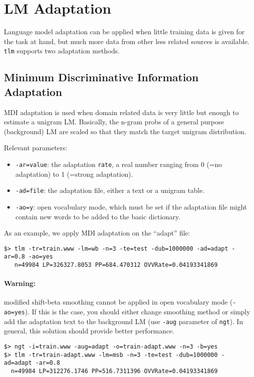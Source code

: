 \documentclass[11pt]{article}
\begin{document}
\newpage
\section{LM Adaptation}
Language model adaptation can be  applied when little training data is given for the 
task at hand, but much more data from other less related sources is available.  {\tt tlm} supports two adaptation methods.

\subsection{Minimum Discriminative Information Adaptation}
MDI adaptation  is used  when domain related  data is very  little but
enough to  estimate a  unigram LM.  Basically,  the n-gram probs  of a
general  purpose (background)  LM are  scaled so  that they  match the
target unigram distribution.
	
\noindent	 
Relevant parameters:
\begin{itemize}
\item {\tt -ar=value}: the adaptation {\tt rate},  a real number ranging 
 from 0 (=no adaptation) to 1 (=strong adaptation).

\item {\tt -ad=file}: the  adaptation file,  either a text  or a
  unigram table.

\item {\tt -ao=y}: open vocabulary mode, which  must be set if the adaptation file
 might contain new words to be added to the basic dictionary.
\end{itemize}

\noindent
As an example, we apply MDI adaptation on the ``adapt'' file:
\begin{small}
\begin{verbatim}
$> tlm -tr=train.www -lm=wb -n=3 -te=test -dub=1000000 -ad=adapt -ar=0.8 -ao=yes
   n=49984 LP=326327.8053 PP=684.470312 OVVRate=0.04193341869
\end{verbatim}
\end{small}

\noindent
\paragraph{Warning:}  modified shift-beta  smoothing  cannot  be applied  in  open
vocabulary mode  ({\tt -ao=yes}).  If  this is the  case, you  should either
change  smoothing method  or simply  add  the adaptation  text to  the
background LM (use {\tt -aug} parameter  of {\tt ngt}). In
general, this solution should  provide better performance.
\begin{small}
\begin{verbatim}
$> ngt -i=train.www -aug=adapt -o=train-adapt.www -n=3 -b=yes
$> tlm -tr=train-adapt.www -lm=msb -n=3 -te=test -dub=1000000 -ad=adapt -ar=0.8
  n=49984 LP=312276.1746 PP=516.7311396 OVVRate=0.04193341869
\end{verbatim}
\end{small}
\end{document}
